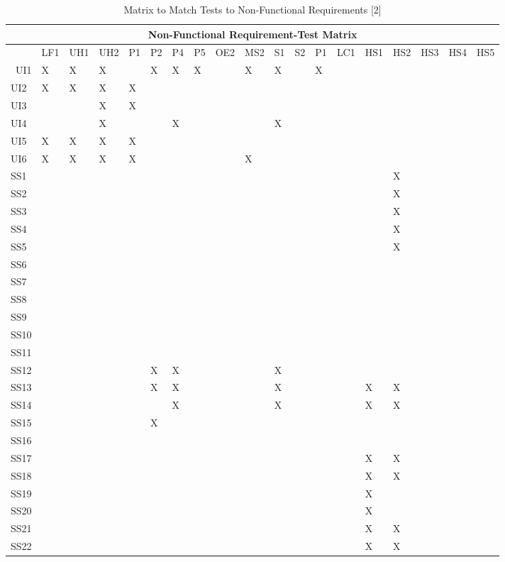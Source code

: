 \documentclass[11pt]{article}
\begin{document}
\begin{table}[H]
\centering
\caption{Matrix to Match Tests to Non-Functional Requirements [2]}
\label{my-label}
\begin{tabular}{| l | l | l | l | l | l | l | l | l | l | l | l | l | l | l | l | l | l | l |}
\hline
\multicolumn{19}{|c|}{\textbf{Non-Functional Requirement-Test Matrix}}                          \\ \hline
 & \tiny{LF1} & \tiny{UH1} & \tiny{UH2} & \tiny{P1} & \tiny{P2} & \tiny{P4} & \tiny{P5} & \tiny{OE2} & \tiny{MS2} & \tiny{S1} & \tiny{S2} & \tiny{P1} & \tiny{LC1} & \tiny{HS1} & \tiny{HS2} & \tiny{HS3} & \tiny{HS4} & \tiny{HS5} \\ \hline\
UI1&X&X&X&&X&X&X&&X&X&&X&&&&&& \\ \hline
UI2&X&X&X&X&&&&&&&&&&&&&& \\ \hline
UI3&&&X&X&&&&&&&&&&&&&& \\ \hline
UI4&&&X&&&X&&&&X&&&&&&&& \\ \hline
UI5&X&X&X&X&&&&&&&&&&&&&& \\ \hline
UI6&X&X&X&X&&&&&X&&&&&&&&& \\ \hline
SS1&&&&&&&&&&&&&&&X&&& \\ \hline
SS2&&&&&&&&&&&&&&&X&&& \\ \hline
SS3&&&&&&&&&&&&&&&X&&& \\ \hline
SS4&&&&&&&&&&&&&&&X&&& \\ \hline
SS5&&&&&&&&&&&&&&&X&&& \\ \hline
SS6&&&&&&&&&&&&&&&&&& \\ \hline
SS7&&&&&&&&&&&&&&&&&& \\ \hline
SS8&&&&&&&&&&&&&&&&&& \\ \hline
SS9&&&&&&&&&&&&&&&&&& \\ \hline
SS10&&&&&&&&&&&&&&&&&& \\ \hline
SS11&&&&&&&&&&&&&&&&&& \\ \hline
SS12&&&&&X&X&&&&X&&&&&&&& \\ \hline
SS13&&&&&X&X&&&&X&&&&X&X&&& \\ \hline
SS14&&&&&&X&&&&X&&&&X&X&&& \\ \hline
SS15&&&&&X&&&&&&&&&&&&& \\ \hline
SS16&&&&&&&&&&&&&&&&&& \\ \hline
SS17&&&&&&&&&&&&&&X&X&&& \\ \hline
SS18&&&&&&&&&&&&&&X&X&&& \\ \hline
SS19&&&&&&&&&&&&&&X&&&& \\ \hline
SS20&&&&&&&&&&&&&&X&&&& \\ \hline
SS21&&&&&&&&&&&&&&X&X&&& \\ \hline
SS22&&&&&&&&&&&&&&X&X&&& \\ \hline
\end{tabular}
\end{table}
\end{document}
